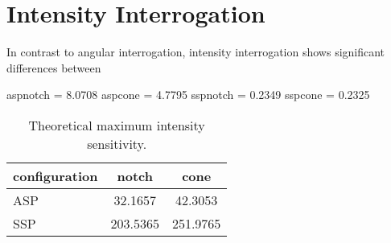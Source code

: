 \section{Intensity Interrogation}
In contrast to angular interrogation, intensity interrogation shows
significant differences between

aspnotch = 8.0708
aspcone = 4.7795
sspnotch = 0.2349
sspcone = 0.2325

\begin{table}
\centering
\begin{tabular}{lSS}
\toprule
{configuration} & {notch} & {cone} \\
\midrule
ASP & 32.1657 & 42.3053 \\
SSP & 203.5365 & 251.9765 \\
\bottomrule
\end{tabular}
\caption{Theoretical maximum intensity sensitivity.}
\label{tbl:intensitysens}
\end{table}



